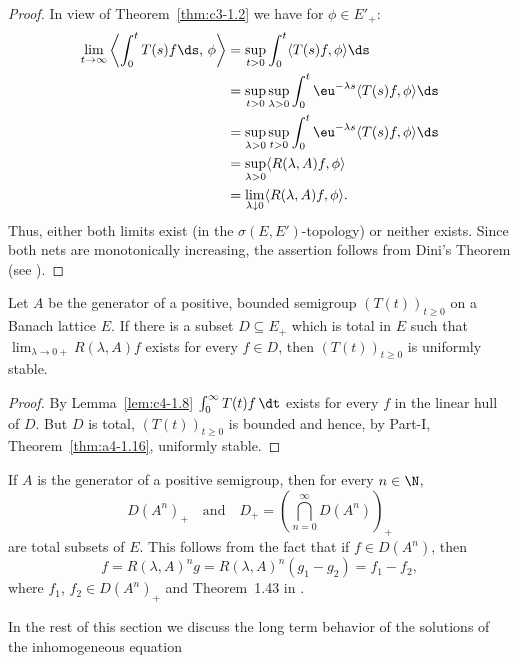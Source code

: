 \begin{proof}
In view of Theorem~\ref{thm:c3-1.2}  we have for $\phi \in E'_{+}$:
\begin{align*}
\lim_{t \to \infty}  \left\langle\int_{0}^{t} T(s)f \ds  ,\,\phi\right\rangle &= \sup_{t>0} \int_{0}^{t}\langle T(s)f,\phi\rangle \ds \\
&= \sup_{t>0}\sup_{\lambda>0} \int_{0}^{t}\eu^{-\lambda s}\langle T(s)f,\phi\rangle \ds \\
&= \sup_{\lambda>0}\sup_{t>0} \int_{0}^{t}\eu^{-\lambda s}\langle T(s)f,\phi\rangle \ds \\
&= \sup_{\lambda>0} \langle R(\lambda,A)f,\phi\rangle \\
&= \lim_{\lambda \downarrow 0} \langle R(\lambda,A)f,\phi\rangle.
\end{align*}
Thus, either both limits exist (in the $\sigma(E,E')$-topology) or neither exists.
Since both nets are monotonically increasing, the assertion follows from Dini's Theorem (see \textcite[II. Theorem~5.9]{schaefer:1974}).
\end{proof}
\begin{proposition}\label{prop:c4-1.9}
%
Let $A$ be the generator of a positive, bounded semigroup $(T(t))_{t \geq 0}$ on a Banach lattice $E$.
If there is a subset $D \subseteq E_{+}$ which is total in $E$ such that $\lim_{\lambda \to 0+} R(\lambda,A)f$ exists for every $f \in D$, then $(T(t))_{t \geq 0}$ is uniformly stable.
\end{proposition}
\begin{proof}
By Lemma~\ref{lem:c4-1.8} $\int_{0}^{\infty} T(t)f \, \dt$ exists for every $f$ in the linear hull of\/ $D$.
But $D$ is total, $(T(t))_{t \geq 0}$ is bounded and hence, by Part-I, Theorem~\ref{thm:a4-1.16}, uniformly stable.
\end{proof}
\begin{remark}\label{rem:c4-1.10}
If\/ $A$ is the generator of a positive semigroup, then for every $n \in \N$, 
\[
D(A^{n})_{+}
\quad \text{and} \quad 
D_{+} =  \left(\bigcap_{n=0}^{\infty} D(A^{n})\right)_{+}
\]
are total subsets of\/ $E$.
This follows from the fact that if  $f \in D(A^{n})$, then 
\[
    f = R(\lambda,A)^{n}g = R(\lambda,A)^{n}(g_{1} - g_{2}) = f_{1} - f_{2},
\]
where $f_{1}$, $f_{2} \in D(A^{n})_{+}$ and Theorem~1.43 in \textcite{davies:1980}.
\end{remark}
In the rest of this section we discuss the long term behavior of the solutions of the inhomogeneous equation
